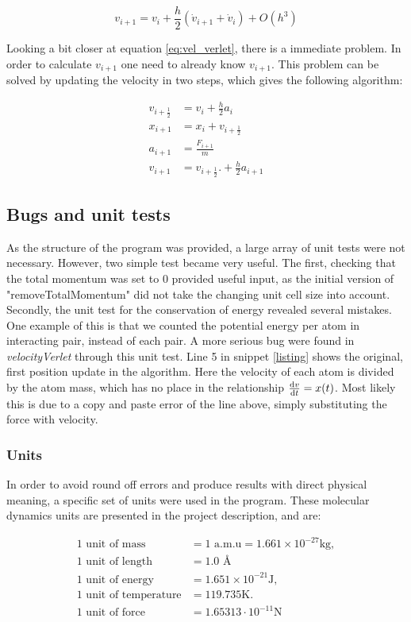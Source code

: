 \begin{equation}
v_{i+1} = v_i +  \frac{h}{2} \left(\dot{v}_{i+1}+\dot{v}_i\right)+ O(h^3) \label{eq:vel_verlet}
\end{equation}

Looking a bit closer at equation \ref{eq:vel_verlet}, there is a immediate problem. In order to calculate $ v_{i+1} $ one need to already know $ v_{i+1} $. This problem can be solved by updating the velocity in two steps, which gives the following algorithm:

\begin{align}
v_{i+\frac{1}{2}} &= v_i + \frac{h}{2} a_i\\
x_{i+1} &= x_i + v_{i+\frac{1}{2}}\\
a_{i+1} &= \frac{F_{i+1}}{m}\\
v_{i+1} &=v_{i+\frac{1}{2}}. + \frac{h}{2} a_{i+1}
\end{align} 


\subsection{Bugs and unit tests}

As the structure  of the program was provided, a large array of unit tests were not necessary. However, two simple test became very useful. The first, checking that the total momentum was set to 0 provided useful input, as the initial version of "removeTotalMomentum" did not take the changing unit cell size into account. Secondly, the unit test for the conservation of energy revealed several mistakes. One example of this is that we counted the potential energy per atom in interacting pair, instead of each pair. A more serious bug were found in \textit{velocityVerlet} through this unit test. Line 5 in snippet \ref{listing} shows the original, first position update in the algorithm. Here the velocity of each atom is divided by the atom mass, which has no place in the relationship $ \dv{v}{t} = x(t) $. Most likely this is due to a copy and paste error of the line above, simply substituting the force with velocity. 

\subsubsection{Units} \label{sec:units}

In order to avoid round off errors and produce results with direct physical meaning, a specific set of units were used in the program. These molecular dynamics units are presented in the project description, and are:

\begin{align}
\text{1 unit of mass } &= 1 \text{ a.m.u} = 1.661\times 10^{-27}\mathrm{kg},\\
\text{1 unit of length } &= 1.0 \text{ \AA} \\
\text{1 unit of energy } &= 1.651\times 10^{-21}\mathrm{J},\\
\text{1 unit of temperature} &= 119.735\mathrm{K}.\\
\text{1 unit of force}  &= 1.65313\cdot10^{-11} \text{N} 
\end{align}





